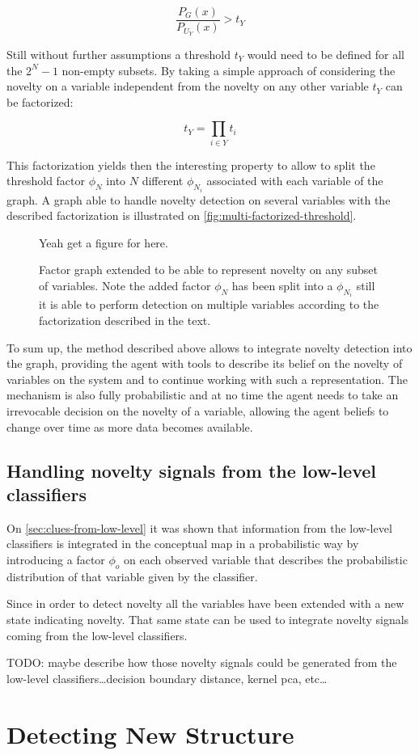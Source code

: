 \begin{equation}
\label{eq:multiple-threshold}
\frac{P_G(x)}{P_{U_Y}(x)} > t_Y
\end{equation}

Still without further assumptions a threshold $t_Y$ would need to be defined for
all the $2^N-1$ non-empty subsets.
By taking a simple approach of considering the novelty on a variable independent
from the novelty on any other variable $t_Y$ can be factorized:

\begin{equation}
t_Y = \prod_{i \in Y}{t_i}
\end{equation}

This factorization yields then the interesting property to allow to split the
threshold factor $\phi_N$ into $N$ different $\phi_{N_i}$ associated with each
variable of the graph. A graph able to handle novelty detection on several
variables with the described factorization is illustrated on
\autoref{fig:multi-factorized-threshold}.

\begin{figure}[h]
\centering
Yeah get a figure for here.
\caption{\label{fig:multi-factorized-threshold}Factor graph extended to be able
         to represent novelty on any subset of variables. Note the added factor
         $\phi_N$ has been split into a $\phi_{N_i}$ still it is able to perform
         detection on multiple variables according to the factorization
         described in the text.}
\end{figure}


To sum up, the method described above allows to integrate novelty detection
into the graph, providing the agent with tools to describe its belief on the
novelty of variables on the system and to continue working with such a
representation. The mechanism is also fully probabilistic and at no time
the agent needs to take an irrevocable decision on the novelty of a variable,
allowing the agent beliefs to change over time as more data becomes available.


\subsection{Handling novelty signals from the low-level classifiers}
On \autoref{sec:clues-from-low-level} it was shown that information from the
low-level classifiers is integrated in the conceptual map in a probabilistic
way by introducing a factor $\phi_o$ on each observed variable that describes
the probabilistic distribution of that variable given by the classifier.

Since in order to detect novelty all the variables have been extended with a
new state indicating novelty. That same state can be used to integrate novelty
signals coming from the low-level classifiers.

TODO: maybe describe how those novelty signals could be generated from the
low-level classifiers\dots decision boundary distance, kernel pca, etc\dots


\section{Detecting New Structure}

